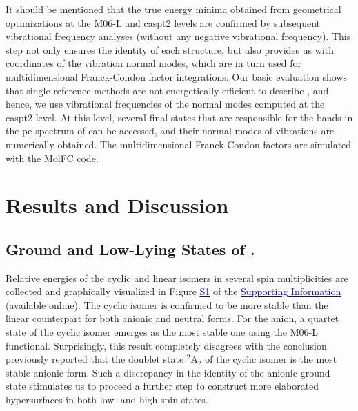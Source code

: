 \begin{refsection}
It should be mentioned that the true energy minima obtained from geometrical optimizations at the M06-L and \acrshort{caspt2} levels are confirmed by subsequent vibrational frequency analyses (without any negative vibrational frequency). This step not only ensures the identity of each structure, but also provides us with coordinates of the vibration normal modes, which are in turn used for multidimensional Franck-Condon factor integrations. Our basic evaluation shows that single-reference methods are not energetically efficient to describe , and hence, we use vibrational frequencies of the normal modes computed at the \acrshort{caspt2} level. At this level, several final states that are responsible for the bands in the \acrshort{pe} spectrum of  can be accessed, and their normal modes of vibrations are numerically obtained. The multidimensional Franck-Condon factors are simulated with the MolFC code. \cite{c4:38}





\section{Results and Discussion}



\subsection{Ground and Low-Lying States of .}




Relative energies of the cyclic and linear isomers in several spin multiplicities are collected and graphically visualized in Figure \href{https://pubs.acs.org/doi/suppl/10.1021/acs.jpca.7b00245/suppl_file/jp7b00245_si_001.pdf}{\textcolor{blue}{S1}} of the \href{https://pubs.acs.org/doi/suppl/10.1021/acs.jpca.7b00245/suppl_file/jp7b00245_si_001.pdf}{\textcolor{blue}{Supporting Information}} (available online). The cyclic isomer is confirmed to be more stable than the linear counterpart for both anionic and neutral forms. For the anion, a quartet state of the cyclic isomer emerges as the most stable one using the M06-L functional. Surprisingly, this result completely disagrees with the conclusion previously reported \cite{c4:22} that the doublet state $^2$A$_2$ of the cyclic isomer is the most stable anionic form. Such a discrepancy in the identity of the anionic ground state stimulates us to proceed a further step to construct more elaborated  hypersurfaces in both low- and high-spin states. 




\end{refsection}
